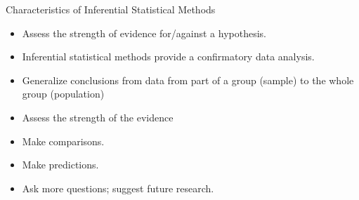 \documentclass[10pt,dvipsnames, aspectratio=169]{beamer}
\begin{document}
\begin{frame}[t]{Characteristics of Inferential Statistical Methods}
	\begin{itemize}
		\item Assess the strength of evidence for/against a hypothesis.
		\item Inferential statistical methods provide a confirmatory
		data analysis.
		\item Generalize conclusions from data from part of a
		group (sample) to the whole group (population)
		\item Assess the strength of the evidence
		\item Make comparisons.
		\item Make predictions.
		\item Ask more questions; suggest future research.
	\end{itemize}
\end{frame}
\end{document}

